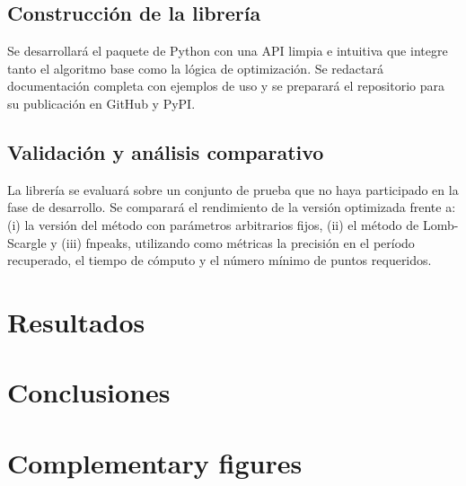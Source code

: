 \documentclass[12pt,letterpaper,oneside]{book}
\begin{document}
\section{Construcción de la librería}
Se desarrollará el paquete de Python con una API limpia e intuitiva que integre tanto el algoritmo base como la lógica de optimización. Se redactará documentación completa con ejemplos de uso y se preparará el repositorio para su publicación en GitHub y PyPI.

\section{Validación y análisis comparativo}
La librería se evaluará sobre un conjunto de prueba que no haya participado en la fase de desarrollo. Se comparará el rendimiento de la versión optimizada frente a: (i) la versión del método con parámetros arbitrarios fijos, (ii) el método de Lomb-Scargle y (iii) fnpeaks, utilizando como métricas la precisión en el período recuperado, el tiempo de cómputo y el número mínimo de puntos requeridos.

\chapter{Resultados}

\chapter{Conclusiones}


\nocite{*}%




\appendix
\noappendicestocpagenum
\addappheadtotoc




\chapter{Complementary figures}
\end{document}

